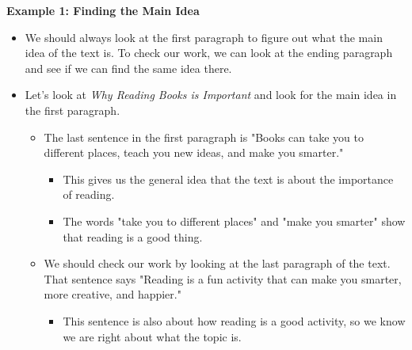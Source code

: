 \documentclass[12pt]{article}
\begin{document}
\vspace{1em}
\begin{tcolorbox}[colframe=black!60, colback=white, 
coltitle=black, colbacktitle=black!15, fonttitle=\bfseries\Large, 
title=Examples, halign title=center, left=10pt, right=10pt, top=10pt, bottom=15pt]

\textbf{Example 1: Finding the Main Idea}
\begin{itemize}
    \item We should always look at the first paragraph to figure out what the main idea of the text is. To check our work, we can look at the ending paragraph and see if we can find the same idea there. 
    \item Let's look at \textit{Why Reading Books is Important} and look for the main idea in the first paragraph.
    \begin{itemize}
        \item The last sentence in the first paragraph is "Books can take you to different places, teach you new ideas, and make you smarter." 
        \begin{itemize}
            \item This gives us the general idea that the text is about the importance of reading.
            \item The words "take you to different places" and "make you smarter" show that reading is a good thing.
        \end{itemize}
        \item We should check our work by looking at the last paragraph of the text. That sentence says "Reading is a fun activity that can make you smarter, more creative, and happier."
        \begin{itemize}
            \item This sentence is also about how reading is a good activity, so we know we are right about what the topic is.
        \end{itemize}
    \end{itemize}
\end{itemize}

\end{tcolorbox}

\vspace{1em}
\end{document}
